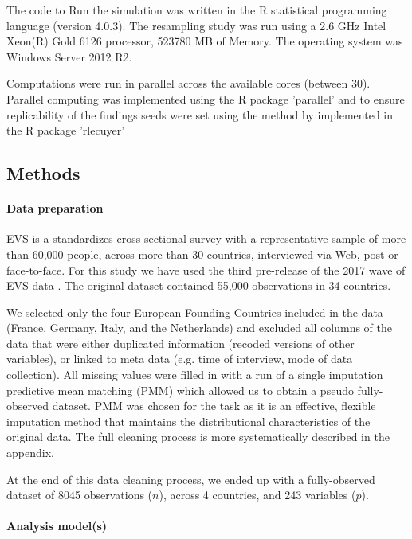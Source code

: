 	The code to Run the simulation was written in the R statistical programming language (version 4.0.3). 
	The resampling study was run using a 2.6 GHz Intel Xeon(R) Gold 6126 processor, 523780 MB of Memory. The
	operating system was Windows Server 2012 R2.

	Computations were run in parallel across the available cores (between 30). Parallel computing 
	was implemented using the R package 'parallel' and to ensure replicability of the findings seeds were
	set using the method by \cite{lecuyer:2002} implemented in the R package 'rlecuyer'

\subsection{Methods}

\paragraph{Data preparation}
	EVS is a standardizes cross-sectional survey with a representative sample of more than 60,000 
	people, across more than 30 countries, interviewed via Web, post or face-to-face.
	For this study we have used the third pre-release of the 2017 wave of EVS data \citep{EVS:2017}.
	The original dataset contained 55,000 observations in 34 countries.

	We selected only the four European Founding Countries included in the data (France, Germany,
	Italy, and the Netherlands) and excluded all columns of the data that were either duplicated
	information (recoded versions of other variables), or linked to meta data (e.g. time of interview,
	mode of data collection). 
	All missing values were filled in with a run of a single imputation predictive mean matching (PMM) 
	which allowed us to obtain a pseudo fully-observed dataset. PMM was chosen for the task as it 
	is an effective, flexible imputation method that maintains the distributional characteristics of 
	the original data. 
	The full cleaning process is more systematically described in the appendix.

	At the end of this data cleaning process, we ended up with a fully-observed dataset
	of 8045 observations ($n$), across 4 countries, and 243 variables ($p$).

\paragraph{Analysis model(s)}

